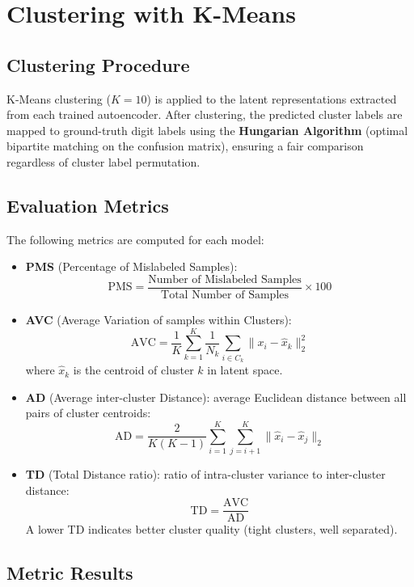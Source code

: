 \documentclass[12pt,a4paper]{article}
\begin{document}
\section{Clustering with K-Means}

\subsection{Clustering Procedure}

K-Means clustering ($K=10$) is applied to the latent representations extracted from each trained autoencoder. After clustering, the predicted cluster labels are mapped to ground-truth digit labels using the \textbf{Hungarian Algorithm} (optimal bipartite matching on the confusion matrix), ensuring a fair comparison regardless of cluster label permutation.

\subsection{Evaluation Metrics}

The following metrics are computed for each model:

\begin{itemize}
  \item \textbf{PMS} (Percentage of Mislabeled Samples):
        \[
          \mathrm{PMS} = \frac{\text{Number of Mislabeled Samples}}{\text{Total Number of Samples}} \times 100
        \]
  \item \textbf{AVC} (Average Variation of samples within Clusters):
        \[
          \mathrm{AVC} = \frac{1}{K} \sum_{k=1}^{K} \frac{1}{N_k} \sum_{i \in C_k} \|x_i - \hat{x}_k\|_2^2
        \]
        where $\hat{x}_k$ is the centroid of cluster $k$ in latent space.
  \item \textbf{AD} (Average inter-cluster Distance): average Euclidean distance between all pairs of cluster centroids:
        \[
          \mathrm{AD} = \frac{2}{K(K-1)} \sum_{i=1}^{K} \sum_{j=i+1}^{K} \|\hat{x}_i - \hat{x}_j\|_2
        \]
  \item \textbf{TD} (Total Distance ratio): ratio of intra-cluster variance to inter-cluster distance:
        \[
          \mathrm{TD} = \frac{\mathrm{AVC}}{\mathrm{AD}}
        \]
        A lower TD indicates better cluster quality (tight clusters, well separated).
\end{itemize}

\subsection{Metric Results}
\end{document}
